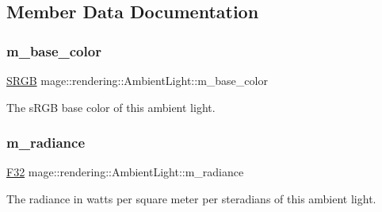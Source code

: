 \subsection{Member Data Documentation}
\hypertarget{classmage_1_1rendering_1_1_ambient_light_a9b6bf87dbc6f12644b5ace67f03aa883}{}\label{classmage_1_1rendering_1_1_ambient_light_a9b6bf87dbc6f12644b5ace67f03aa883} 
\subsubsection{\texorpdfstring{m\+\_\+base\+\_\+color}{m\_base\_color}}
{\footnotesize\ttfamily \hyperlink{structmage_1_1_s_r_g_b}{S\+R\+GB} mage\+::rendering\+::\+Ambient\+Light\+::m\+\_\+base\+\_\+color\hspace{0.3cm}{\ttfamily [private]}}

The s\+R\+GB base color of this ambient light. \hypertarget{classmage_1_1rendering_1_1_ambient_light_adfdafe01958a72df46eeb3c0f5f0d0c4}{}\label{classmage_1_1rendering_1_1_ambient_light_adfdafe01958a72df46eeb3c0f5f0d0c4} 
\subsubsection{\texorpdfstring{m\+\_\+radiance}{m\_radiance}}
{\footnotesize\ttfamily \hyperlink{namespacemage_aa97e833b45f06d60a0a9c4fc22ae02c0}{F32} mage\+::rendering\+::\+Ambient\+Light\+::m\+\_\+radiance\hspace{0.3cm}{\ttfamily [private]}}

The radiance in watts per square meter per steradians of this ambient light. 